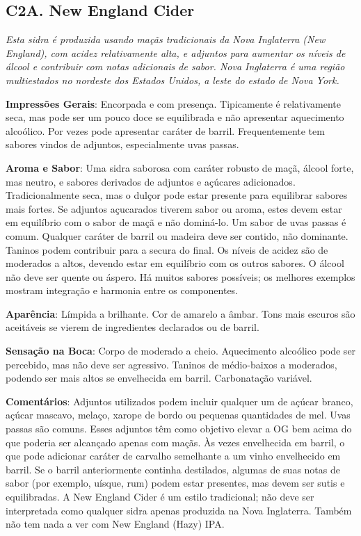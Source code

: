 \subsection*{C2A. New England Cider}

\textit{Esta sidra é produzida usando maçãs tradicionais da Nova Inglaterra (New England), com acidez relativamente alta, e adjuntos para aumentar os níveis de álcool e contribuir com notas adicionais de sabor. Nova Inglaterra é uma região multiestados no nordeste dos Estados Unidos, a leste do estado de Nova York.}

\textbf{Impressões Gerais}: Encorpada e com presença. Tipicamente é relativamente seca, mas pode ser um pouco doce se equilibrada e não apresentar aquecimento alcoólico. Por vezes pode apresentar caráter de barril. Frequentemente tem sabores vindos de adjuntos, especialmente uvas passas.

\textbf{Aroma e Sabor}: Uma sidra saborosa com caráter robusto de maçã, álcool forte, mas neutro, e sabores derivados de adjuntos e açúcares adicionados. Tradicionalmente seca, mas o dulçor pode estar presente para equilibrar sabores mais fortes. Se adjuntos açucarados tiverem sabor ou aroma, estes devem estar em equilíbrio com o sabor de maçã e não dominá-lo. Um sabor de uvas passas é comum. Qualquer caráter de barril ou madeira deve ser contido, não dominante. Taninos podem contribuir para a secura do final. Os níveis de acidez são de moderados a altos, devendo estar em equilíbrio com os outros sabores. O álcool não deve ser quente ou áspero. Há muitos sabores possíveis; os melhores exemplos mostram integração e harmonia entre os componentes.

\textbf{Aparência}: Límpida a brilhante. Cor de amarelo a âmbar. Tons mais escuros são aceitáveis se vierem de ingredientes declarados ou de barril.

\textbf{Sensação na Boca}: Corpo de moderado a cheio. Aquecimento alcoólico pode ser percebido, mas não deve ser agressivo. Taninos de médio-baixos a moderados, podendo ser mais altos se envelhecida em barril. Carbonatação variável.

\textbf{Comentários}: Adjuntos utilizados podem incluir qualquer um de açúcar branco, açúcar mascavo, melaço, xarope de bordo ou pequenas quantidades de mel. Uvas passas são comuns. Esses adjuntos têm como objetivo elevar a OG bem acima do que poderia ser alcançado apenas com maçãs. Às vezes envelhecida em barril, o que pode adicionar caráter de carvalho semelhante a um vinho envelhecido em barril. Se o barril anteriormente continha destilados, algumas de suas notas de sabor (por exemplo, uísque, rum) podem estar presentes, mas devem ser sutis e equilibradas. A New England Cider é um estilo tradicional; não deve ser interpretada como qualquer sidra apenas produzida na Nova Inglaterra. Também não tem nada a ver com New England (Hazy) IPA.

